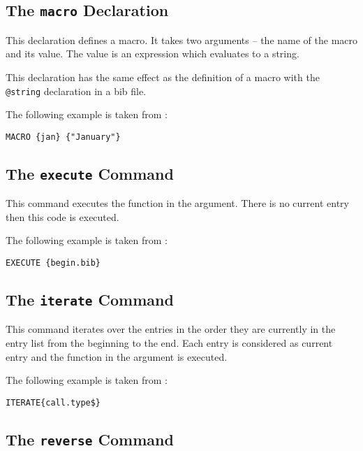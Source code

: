 \subsection{The \texttt{macro} Declaration}

This declaration defines a macro. It takes two arguments -- the name
of the macro and its value. The value is an expression which evaluates
to a string.

This declaration has the same effect as the definition of a macro with
the \texttt{@string} declaration in a bib file.

The following example is taken from :

\begin{lstlisting}[language=bst]
  MACRO {jan} {"January"}
\end{lstlisting}


\subsection{The \texttt{execute} Command}

This command executes the function in the argument. There is no
current entry then this code is executed.

The following example is taken from :

\begin{lstlisting}[language=bst]
  EXECUTE {begin.bib}
\end{lstlisting}


\subsection{The \texttt{iterate} Command}

This command iterates over the entries in the order they are currently
in the entry list from the beginning to the end. Each entry is
considered as current entry and the function in the argument is
executed.

The following example is taken from :

\begin{lstlisting}[language=bst]
  ITERATE{call.type$}
\end{lstlisting}


\subsection{The \texttt{reverse} Command}

